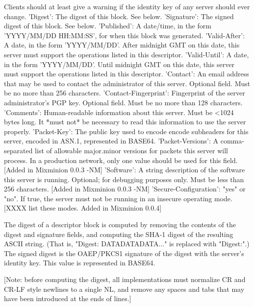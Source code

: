          Clients should at least give a warning if the identity key of
         any server should ever change.
     'Digest': The digest of this block. See below.
     'Signature': The signed digest of this block.  See below.
     'Published': A date/time, in the form 'YYYY/MM/DD HH:MM:SS',
         for when this block was generated.
     'Valid-After': A date, in the form 'YYYY/MM/DD'.  After midnight GMT
         on this date, this server must support the operations listed
         in this descriptor.
     'Valid-Until': A date, in the form 'YYYY/MM/DD'.  Until midnight
         GMT on this date, this server must support the operations listed
         in this descriptor.
     'Contact': An email address that may be used to contact the
         administrator of this server. Optional field.  Must be no
         more than 256 characters.
     'Contact-Fingerprint': Fingerprint of the server administrator's
         PGP key. Optional field.  Must be no more than 128
         characters.
     'Comments': Human-readable information about this server.  Must
         be <1024 bytes long.  It *must not* be necessary to read this
         information to use the server properly.
     'Packet-Key': The public key used to encode encode subheaders for
         this server, encoded in ASN.1, represented in BASE64. 
     'Packet-Versions': A comma-separated list of allowable major.minor
         versions for packets this server will process.  In a
         production network, only one value should be used for this
         field. [Added in Mixminion 0.0.3 -NM]
     'Software': A string description of the software this server is
         running.  Optional; for debugging purposes only.  Must be
         less than 256 characters. [Added in Mixminion 0.0.3 -NM]
     'Secure-Configuration': "yes" or "no".  If true, the server must 
         not be running in an insecure operating mode. [XXXX list
         these modes.  Added in Mixminion 0.0.4]
 
The digest of a descriptor block is computed by removing the contents of the
digest and signature fields, and computing the SHA-1 digest of the resulting
ASCII string.  (That is, "Digest: DATADATADATA..." is replaced with
"Digest:".)  The signed digest is the OAEP/PKCS1 signature of the digest
with the server's identity key.  This value is represented in BASE64.

[Note: before computing the digest, all implementations must normalize CR and
CR-LF style newlines to a single NL, and remove any spaces and tabs that may
have been introduced at the ends of lines.]

